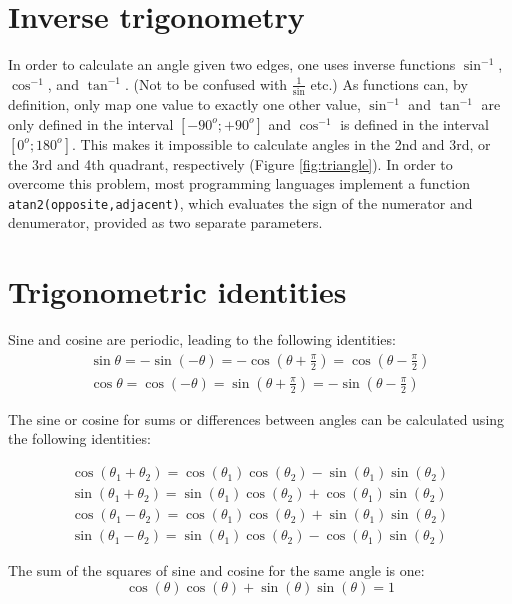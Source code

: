 \section{Inverse trigonometry}
In order to calculate an angle given two edges, one uses inverse functions $\sin^{-1}$, $\cos^{-1}$, and $\tan^{-1}$. (Not to be confused with $\frac{1}{\sin}$ etc.) As functions can, by definition, only map one value to exactly one other value, $\sin^{-1}$ and $\tan^{-1}$ are only defined in the interval $[-90^o;+90^o]$ and $\cos^{-1}$ is defined in the interval $[0^o;180^o]$. This makes it impossible to calculate angles in the 2nd and 3rd, or the 3rd and 4th quadrant, respectively (Figure \ref{fig:triangle}). 
In order to overcome this problem, most programming languages implement a function \texttt{atan2(opposite,adjacent)}, which evaluates the sign of the numerator and denumerator, provided as two separate parameters. 

\section{Trigonometric identities}
Sine and cosine are periodic, leading to the following identities:
\begin{eqnarray}
\sin\theta=-\sin(-\theta)=-\cos(\theta+\frac{\pi}{2})=\cos(\theta-\frac{\pi}{2})\\
\cos\theta=\cos(-\theta)=\sin(\theta+\frac{\pi}{2})=-\sin(\theta-\frac{\pi}{2})
\end{eqnarray}

The sine or cosine for sums or differences between angles can be calculated using the following identities:

\begin{eqnarray}
\cos(\theta_1+\theta_2)=\cos(\theta_1)\cos(\theta_2)-\sin(\theta_1)\sin(\theta_2)\\
\sin(\theta_1+\theta_2)=\sin(\theta_1)\cos(\theta_2)+\cos(\theta_1)\sin(\theta_2)\\
\cos(\theta_1-\theta_2)=\cos(\theta_1)\cos(\theta_2)+\sin(\theta_1)\sin(\theta_2)\\
\sin(\theta_1-\theta_2)=\sin(\theta_1)\cos(\theta_2)-\cos(\theta_1)\sin(\theta_2)
\end{eqnarray}

The sum of the squares of sine and cosine for the same angle is one:
\begin{equation}
\cos(\theta)\cos(\theta)+\sin(\theta)\sin(\theta)=1
\end{equation}